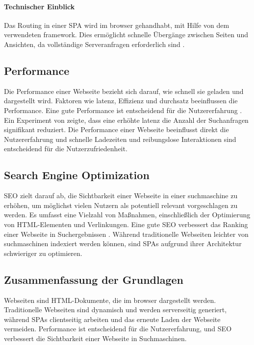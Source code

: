 \paragraph*{Technischer Einblick}
Das Routing in einer \ac{SPA} wird im \gls{browser} gehandhabt, mit Hilfe von dem verwendeten \gls{framework}.
Dies ermöglicht schnelle Übergänge zwischen Seiten und Ansichten, da vollständige Serveranfragen erforderlich sind \cite{Scott2015}.

\subsection{Performance}
Die Performance einer Webseite bezieht sich darauf, wie schnell sie geladen und dargestellt wird.
Faktoren wie \gls{latenz}, Effizienz und \gls{durchsatz} beeinflussen die Performance.
Eine gute Performance ist entscheidend für die Nutzererfahrung \cite{Killelea2002}.
Ein Experiment von  \cite{Google2009} zeigte, dass eine erhöhte \gls{latenz} die Anzahl der Suchanfragen signifikant reduziert.
Die Performance einer Webseite beeinflusst direkt die Nutzererfahrung und schnelle Ladezeiten und reibungslose Interaktionen sind entscheidend für die Nutzerzufriedenheit.

\subsection{Search Engine Optimization}
\ac{SEO} zielt darauf ab, die Sichtbarkeit einer Webseite in einer \gls{suchmaschine} zu erhöhen, um möglichst vielen Nutzern als potentiell relevant vorgeschlagen zu werden.
Es umfasst eine Vielzahl von Maßnahmen, einschließlich der Optimierung von \ac{HTML}-Elementen und Verlinkungen.
Eine gute \ac{SEO} verbessert das Ranking einer Webseite in Suchergebnissen \cite{John2016}.
Während traditionelle Webseiten leichter von \gls{suchmaschine}n indexiert werden können, sind \ac{SPA}s aufgrund ihrer Architektur schwieriger zu optimieren.

\subsection*{Zusammenfassung der Grundlagen}
Webseiten sind \ac{HTML}-Dokumente, die im \gls{browser} dargestellt werden.
Traditionelle Webseiten sind dynamisch und werden serverseitig generiert, während \ac{SPA}s clientseitig arbeiten und das erneute Laden der Webseite vermeiden.
Performance ist entscheidend für die Nutzererfahrung, und \ac{SEO} verbessert die Sichtbarkeit einer Webseite in Suchmaschinen.

